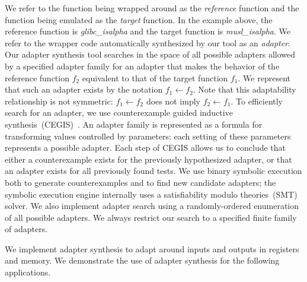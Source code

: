 We refer to the function being wrapped around as the {\em reference} function and the function being emulated as the {\em target} function.
%
In the example above, the reference function is \textit{glibc\_isalpha} and the target function is \textit{musl\_isalpha}.
%
We refer to the wrapper code automatically synthesized by our tool as an {\em adapter}.
%
Our adapter synthesis tool searches in the space of all possible adapters allowed by a specified adapter family for an adapter that makes the behavior of the reference function $f_2$ equivalent to that of the target function $f_1$.
%
We represent that such an adapter exists by the notation $f_1 \leftarrow f_2$.
%
Note that this adaptability relationship is not symmetric: $f_1 \leftarrow f_2$ does not imply $f_2 \leftarrow f_1$. 
%
%
To efficiently search for an adapter, we use counterexample guided inductive synthesis~(CEGIS)~\cite{Solar-LezamaTBSS2006}.
%
An adapter family is represented as a formula for transforming values controlled by parameters: each setting of these parameters represents a possible adapter.
%
Each step of CEGIS allows us to conclude that either a counterexample exists for the previously hypothesized adapter, or that an adapter exists for all previously found tests.
%
We use binary symbolic execution both to generate counterexamples and to find new candidate adapters; the symbolic execution engine internally uses a satisfiability modulo theories~(SMT) solver.
%
We also implement adapter search using a randomly-ordered enumeration of all possible adapters.
%
We always restrict our search to a specified finite family of adapters.

%
We implement adapter synthesis to adapt around inputs and outputs in registers and memory.
%
We demonstrate the use of adapter synthesis for the following applications.
%
